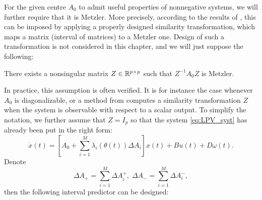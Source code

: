 For the given centre $A_0$ to admit useful properties of nonnegative systems, we will further require that it is Metzler. More precisely, according to the results of , this can be imposed by applying a properly designed similarity transformation, which maps a matrix (interval of matrices) to a Metzler one. Design of such a transformation is not considered in this chapter, and we will just suppose the following:
\begin{assumption}
	\begin{leftbar}[assumptionbar]
	\label{assumpt:metzler}
	There exists a nonsingular matrix $Z\in\mathbb{R}^{p\times p}$ such that $Z^{-1}A_{0}Z$ is Metzler.
	\end{leftbar}
\end{assumption}
In practice, this assumption is often verified. It is for instance the case whenever $A_{0}$ is diagonalizable, or a method from \cite{Efimov2013} computes a similarity transformation $Z$ when the system is observable with respect to a scalar output. To simplify the notation, we further assume that $Z=I_{p}$ so that the system \eqref{eq:LPV_syst} has already been put in the right form:
\[
\dot{x}(t)=[A_{0}+\sum_{i=1}^{M}\lambda_{i}(\theta(t))\Delta A_{i}]x(t)+Bu(t) + D\omega(t).
\]
Denote
\[
\Delta A_{+}=\sum_{i=1}^{M}\Delta A_{i}^{+},\;\Delta A_{-}=\sum_{i=1}^{M}\Delta A_{i}^{-},
\]
then the following interval predictor can be designed:
